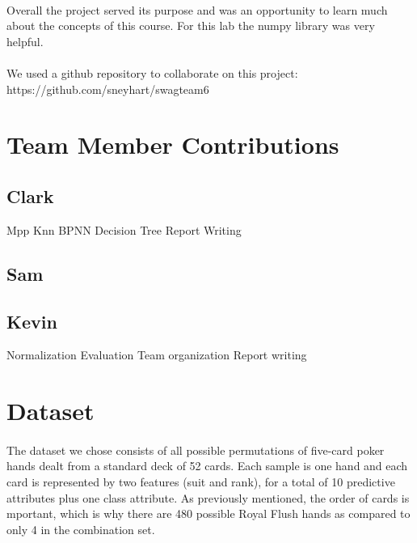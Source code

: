 \documentclass{article}
\begin{document}
\paragraph{} 
Overall the project served its purpose and was an opportunity to learn
much about the concepts of this course. For this lab the 
numpy library was very helpful.
\paragraph{} 
We used a github repository to collaborate on this project:
\newline
https://github.com/sneyhart/swagteam6
\newpage


\section*{Team Member Contributions}
\subsection*{Clark}
\newline
\indent Mpp
\newline
\indent Knn
\newline
\indent BPNN
\newline
\indent Decision Tree
\newline
\indent Report Writing
\newline
\subsection*{Sam}
\subsection*{Kevin}
\newline
\indent Normalization
\newline
\indent Evaluation
\newline
\indent Team organization
\newline
\indent Report writing
\newpage


\section*{Dataset}
\paragraph{}
The dataset we chose consists of all possible permutations of five-card poker hands dealt
from a standard deck of 52 cards.  Each sample is one hand and each card is represented
by two features (suit and rank), for a total of 10 predictive attributes plus one class
attribute.  As previously mentioned, the order of cards is mportant, which is why there
are 480 possible Royal Flush hands as compared to only 4 in the combination set.
\end{document}
